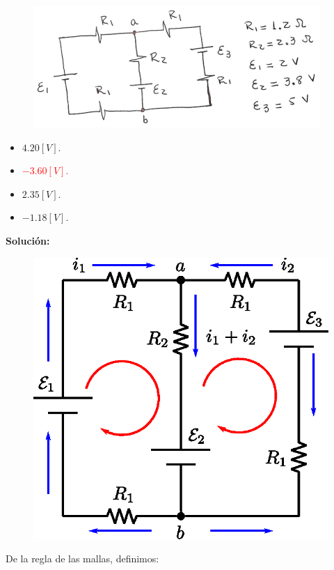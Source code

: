 \documentclass[letter,11pt]{article}
\begin{document}
\begin{enumerate}
\begin{figure}[!h]
\centering
\includegraphics[scale=2.00]{resources/q8.eps}
\end{figure}

\begin{itemize}
    \item $ 4.20 [V]$.
    \item \textcolor{red}{$-3.60 [V]$.}
    \item $ 2.35 [V]$.
    \item $-1.18 [V]$.
\end{itemize}

\textbf{Solución:}

\begin{figure}[!h]
\centering
\includegraphics[scale=0.74]{resources/a8.eps}
\end{figure}

De la regla de las mallas, definimos:


\end{enumerate}
\end{document}
